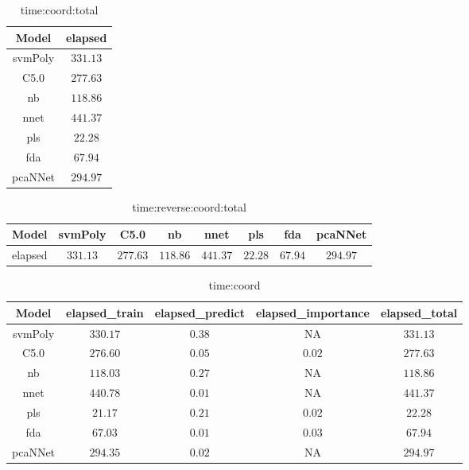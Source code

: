\begin{table}[!ht]
	\centering
	\begin{tabular}{|c|c|}
		\hline
		Model & elapsed \\ \hline
		svmPoly & $331.13$ \\ \hline
		C5.0 & $277.63$ \\ \hline
		nb & $118.86$ \\ \hline
		nnet & $441.37$ \\ \hline
		pls & $22.28$ \\ \hline
		fda & $67.94$ \\ \hline
		pcaNNet & $294.97$ \\ \hline
	\end{tabular}
	\caption{time:coord:total}
	\label{tab:time:coord:total}
\end{table}

\begin{table}[!ht]
	\centering
	\begin{tabular}{|c|c|c|c|c|c|c|c|}
		\hline
		Model & svmPoly & C5.0 & nb & nnet & pls & fda & pcaNNet \\ \hline
		elapsed & $331.13$ & $277.63$ & $118.86$ & $441.37$ & $22.28$ & $67.94$ & $294.97$ \\ \hline
	\end{tabular}
	\caption{time:reverse:coord:total}
	\label{tab:time:reverse:coord:total}
\end{table}

\begin{table}[!ht]
	\centering
	\begin{tabular}{|c|c|c|c|c|}
		\hline
		Model & elapsed_train & elapsed_predict & elapsed_importance & elapsed_total \\ \hline
		svmPoly & $330.17$ & $0.38$ & NA & $331.13$ \\ \hline
		C5.0 & $276.60$ & $0.05$ & $0.02$ & $277.63$ \\ \hline
		nb & $118.03$ & $0.27$ & NA & $118.86$ \\ \hline
		nnet & $440.78$ & $0.01$ & NA & $441.37$ \\ \hline
		pls & $21.17$ & $0.21$ & $0.02$ & $22.28$ \\ \hline
		fda & $67.03$ & $0.01$ & $0.03$ & $67.94$ \\ \hline
		pcaNNet & $294.35$ & $0.02$ & NA & $294.97$ \\ \hline
	\end{tabular}
	\caption{time:coord}
	\label{tab:time:coord}
\end{table}

